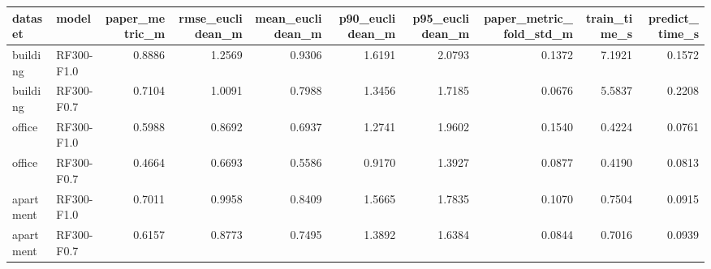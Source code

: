 \begin{tabular}{llrrrrrrrr}
\toprule
dataset & model & paper\_metric\_m & rmse\_euclidean\_m & mean\_euclidean\_m & p90\_euclidean\_m & p95\_euclidean\_m & paper\_metric\_fold\_std\_m & train\_time\_s & predict\_time\_s \\
\midrule
building & RF300-F1.0 & 0.8886 & 1.2569 & 0.9306 & 1.6191 & 2.0793 & 0.1372 & 7.1921 & 0.1572 \\
building & RF300-F0.7 & 0.7104 & 1.0091 & 0.7988 & 1.3456 & 1.7185 & 0.0676 & 5.5837 & 0.2208 \\
office & RF300-F1.0 & 0.5988 & 0.8692 & 0.6937 & 1.2741 & 1.9602 & 0.1540 & 0.4224 & 0.0761 \\
office & RF300-F0.7 & 0.4664 & 0.6693 & 0.5586 & 0.9170 & 1.3927 & 0.0877 & 0.4190 & 0.0813 \\
apartment & RF300-F1.0 & 0.7011 & 0.9958 & 0.8409 & 1.5665 & 1.7835 & 0.1070 & 0.7504 & 0.0915 \\
apartment & RF300-F0.7 & 0.6157 & 0.8773 & 0.7495 & 1.3892 & 1.6384 & 0.0844 & 0.7016 & 0.0939 \\
\bottomrule
\end{tabular}
